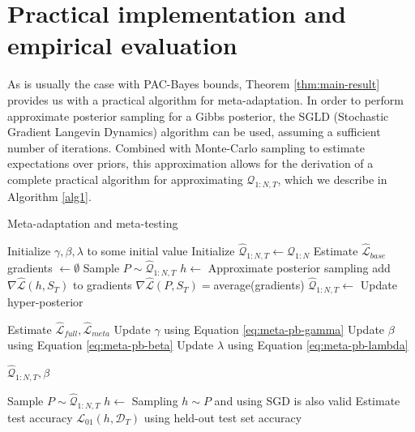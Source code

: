 \documentclass{article}
\theoremstyle{definition}
\begin{document}
\section{Practical implementation and empirical evaluation}

As is usually the case with PAC-Bayes bounds, Theorem \ref{thm:main-result} provides us with a practical algorithm for meta-adaptation. In order to perform approximate posterior sampling for a Gibbs posterior, the SGLD (Stochastic Gradient Langevin Dynamics) algorithm \citep{Welling2011} can be used, assuming a sufficient number of iterations.
Combined with Monte-Carlo sampling to estimate expectations over priors, 
this approximation allows for the derivation of a complete practical algorithm for approximating $\mathcal{Q}_{1:N,T}$, which we describe in Algorithm \ref{alg1}.

\begin{algorithm}[H]
	\caption{Meta-adaptation and meta-testing}
	\label{alg1}
	\small
	\begin{algorithmic}
		\State Initialize $\gamma, \beta, \lambda$ to some initial value 
		\State Initialize $\hat{\mathcal{Q}}_{1:N, T}\leftarrow \mathcal{Q}_{1:N}$
		\State Estimate $\hat{\mathcal{L}}_{base}$
			\State gradients $\leftarrow \emptyset$
				\State Sample $P\sim \hat{\mathcal{Q}}_{1:N, T}$
				\State $h\leftarrow$  \Comment Approximate posterior sampling
				\State add $\nabla \hat{\mathcal{L}}(h, S_T)$ to gradients
			\EndFor
			\State $\nabla \hat{\mathcal{L}}(P, S_T)=$average(gradients)
			\State $\hat{\mathcal{Q}}_{1:N, T}\leftarrow$  \Comment Update hyper-posterior
			
			\State Estimate $\hat{\mathcal{L}}_{full}, \hat{\mathcal{L}}_{meta}$
			\State Update $\gamma$ using Equation \ref{eq:meta-pb-gamma}
			\State Update $\beta$ using Equation \ref{eq:meta-pb-beta}
			\State Update $\lambda$ using Equation \ref{eq:meta-pb-lambda}
			
		\EndWhile
		\State \Return $\hat{\mathcal{Q}}_{1:N, T}, \beta$
		\EndFunction
		
		\State Sample $P\sim \hat{\mathcal{Q}}_{1:N, T}$
		\State $h\leftarrow$  \Comment Sampling $h\sim P$ and using SGD is also valid
		\State Estimate test accuracy $\mathcal{L}_{01}(h, \mathcal{D}_T)$ using held-out test set
		\State \Return accuracy
		\EndFunction
	\end{algorithmic}
\end{algorithm}
\end{document}
